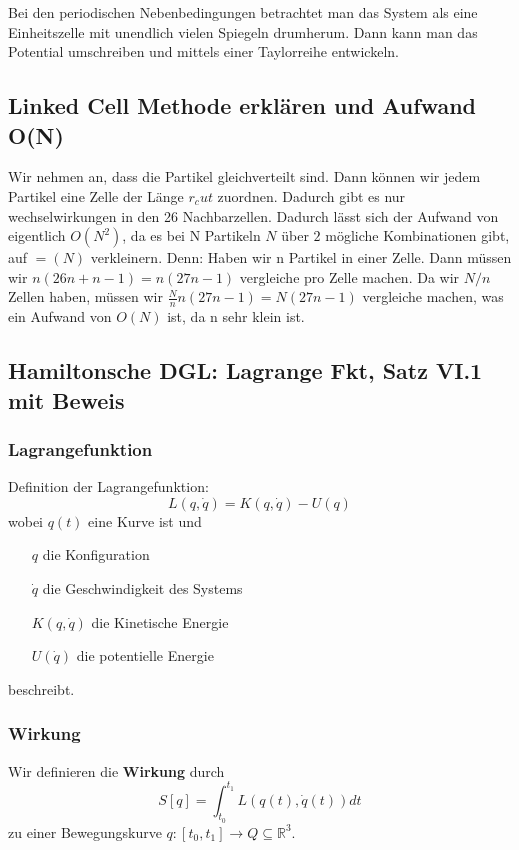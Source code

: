 \documentclass[]{article}
\begin{document}
Bei den periodischen Nebenbedingungen betrachtet man das System als eine Einheitszelle mit unendlich vielen Spiegeln drumherum. Dann kann man das Potential umschreiben und mittels einer Taylorreihe entwickeln.

\subsection*{Linked Cell Methode erklären und Aufwand O(N)}
Wir nehmen an, dass die Partikel gleichverteilt sind. Dann können wir jedem Partikel eine Zelle der Länge $r_cut$ zuordnen. Dadurch gibt es nur wechselwirkungen in den 26 Nachbarzellen. Dadurch lässt sich der Aufwand von eigentlich $O(N^2)$, da es bei N Partikeln $N $ über $2$ mögliche Kombinationen gibt, auf $=(N)$ verkleinern. 
Denn: Haben wir n Partikel in einer Zelle. Dann müssen wir $n(26n+n-1)=n(27n-1)$ vergleiche pro Zelle machen. Da wir $N/n $ Zellen haben, müssen wir $\frac{N}{n}n(27n-1)= N(27n-1)$ vergleiche machen, was ein Aufwand von $O(N)$ ist, da n sehr klein ist. 
 
\subsection*{Hamiltonsche DGL: Lagrange Fkt, Satz VI.1 mit Beweis}
\subsubsection*{Lagrangefunktion}
Definition der Lagrangefunktion:  
\begin{equation*}
L(q, \dot{q}) = K(q, \dot{q}) - U(q)
\end{equation*}
wobei $q(t)$ eine Kurve ist und
\begin{itemize}
	\item[$q$] die Konfiguration
	\item[$\dot{q}$] die Geschwindigkeit des Systems
	\item[$K(q, \dot{q})$] die Kinetische Energie
	\item[$U(\dot{q})$] die potentielle Energie
\end{itemize}
beschreibt. \\

\subsubsection*{Wirkung}
Wir definieren die \textbf{Wirkung} durch
\begin{equation*}
S[q] = \int_{t_0}^{t_1} L(q(t), \dot{q}(t) ) dt
\end{equation*}
zu einer Bewegungskurve $q : [t_0, t_1] \to Q \subseteq \mathbb{R}^3$. 
\end{document}

